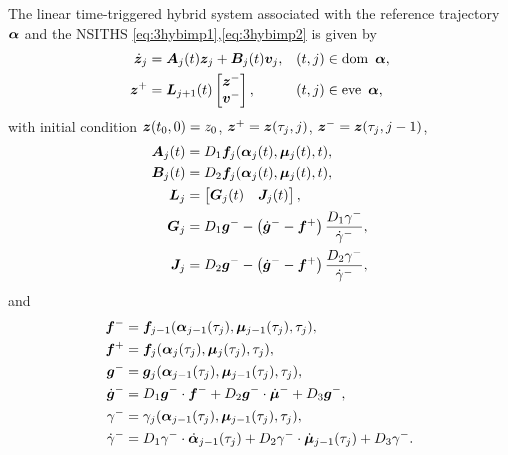 \documentclass[../DC2017114Bouma.tex]{subfiles}
\begin{document}
\begin{mydef}[LTTHS]\label{def:3ltths}
The linear time-triggered hybrid system associated with the reference trajectory $\alphab$ and the NSITHS \eqref{eq:3hybimp1},\eqref{eq:3hybimp2} is given by
\begin{align}
\dot{\zb}_j &= \Ab_j(t)\zb_j + \Bb_j(t)\vb_j, &(t,j)&\in \dom\ \alphab,\\
\zb^+ &= \Lb_{j+1}(t) \begin{bmatrix}\zb^- \\ \vb^-\end{bmatrix}, &(t,j)&\in \eve\ \alphab,
\end{align}
with initial condition $\zb(t_0,0)=z_0$, $\zb^+ = \zb(\tau_j,j)$, $\zb^- = \zb(\tau_j,j-1)$,
\begin{align*}
\Ab_j(t) &= D_1\fb_j(\alphab_j(t),\mub_j(t),t),\\
\Bb_j(t) &= D_2\fb_j(\alphab_j(t),\mub_j(t),t),\\
\Lb_j &= \begin{bmatrix}\Gb_j(t) & \Jb_j(t)\end{bmatrix},\\
\Gb_j &= D_1\gb^- - \left(\dot{\gb}^- - \fb^+\right)\frac{D_1\gamma^-}{\dot{\gamma}^-},\\
\Jb_j &= D_2\gb^- - \left(\dot{\gb}^- - \fb^+\right)\frac{D_2\gamma^-}{\dot{\gamma}^-},
\end{align*}
and
\begin{align*}
\fb^- &= \fb_{j-1}(\alphab_{j-1}(\tau_j),\mub_{j-1}(\tau_j),\tau_j),\\
\fb^+ &= \fb_j(\alphab_j(\tau_j),\mub_j(\tau_j),\tau_j),\\
\gb^- &= \gb_{j}(\alphab_{j-1}(\tau_j),\mub_{j-1}(\tau_j),\tau_j),\\
\dot{\gb}^- &= D_1\gb^-\cdot \fb^- + D_2\gb^-\cdot \dot{\mub}^- + D_3\gb^-,\\
\gamma^- &= \gamma_j(\alphab_{j-1}(\tau_j),\mub_{j-1}(\tau_j),\tau_j),\\
\dot{\gamma}^- &= D_1\gamma^-\cdot\dot{\alphab}_{j-1}(\tau_j) + D_2\gamma^-\cdot\dot{\mub}_{j-1}(\tau_j) + D_3\gamma^-.
\end{align*}
\end{mydef}
\end{document}

